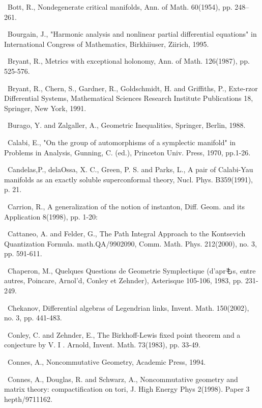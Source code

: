 {\noindent [50]\ Bott, R., Nondegenerate critical manifolds, Ann. of Math. 60(1954), pp. 248--261.\par\smallskip
\noindent [51]\ Bourgain, J., "Harmonic analysis and nonlinear partial differential equations" in International Congress of Mathematics, Birkhiiuser, Ziirich, 1995.\par\smallskip
\noindent [52]\ Bryant, R., Metrics with exceptional holonomy, Ann. of Math. 126(1987), pp. 525-576.\par\smallskip
\noindent [53]\ Bryant, R., Chern, S., Gardner, R., Goldschmidt, H. and Griffiths, P., Exte-rzor Differential Systems, Mathematical Sciences Research Institute Publications 18, Springer, New York, 1991.\par\smallskip
\noindent [54]\ Burago, Y. and Zalgaller, A., Geometric Inequalities, Springer, Berlin, 1988.\par\smallskip
\noindent [55]\ Calabi, E., "On the group of automorphisms of a symplectic manifold" in Problems in Analysis, Gunning, C. (ed.), Princeton Univ. Press, 1970, pp.1-26.\par\smallskip
\noindent [56]\ Candelas,P., delaOssa, X. C., Green, P. S. and Parks, L., A pair of Calabi-Yau manifolds as an exactly soluble superconformal theory, Nucl. Phys. B359(1991), p. 21.\par\smallskip
\noindent [57]\ Carrion, R., A generalization of the notion of instanton, Diff. Geom. and its Application 8(1998), pp. 1-20:\par\smallskip
\noindent [58]\ Cattaneo, A. and Felder, G., The Path Integral Approach to the Kontsevich Quantization Formula. math.QA/9902090, Comm. Math. Phys. 212(2000), no. 3, pp. 591-611.\par\smallskip
\noindent [59]\ Chaperon, M., Quelques Questions de Geometrie Symplectique (d'aprもs, entre autres, Poincare, Arnol'd, Conley et Zehnder), Asterisque 105-106, 1983, pp. 231-249.\par\smallskip
\noindent [60]\ Chekanov, Differential algebras of Legendrian links, Invent. Math. 150(2002), no. 3, pp. 441-483.\par\smallskip
\noindent [61]\ Conley, C. and Zehnder, E., The Birkhoff-Lewis fixed point theorem and a conjecture by V. I . Arnold, Invent. Math. 73(1983), pp. 33-49.\par\smallskip
\noindent [62]\ Connes, A., Noncommutative Geometry, Academic Press, 1994.\par\smallskip
\noindent [63]\ Connes, A., Douglas, R. and Schwarz, A., Noncommutative geometry and matrix theory: compactification on tori, J. High Energy Phys 2(1998). Paper 3 hepth/9711162.\par\smallskip
}
